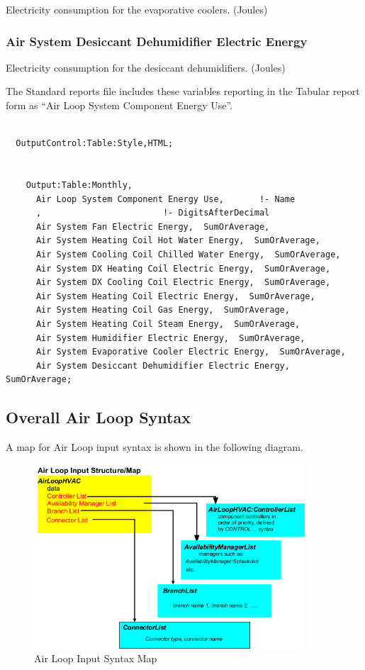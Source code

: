 Electricity consumption for the evaporative coolers. (Joules)

\subsubsection{Air System Desiccant Dehumidifier Electric Energy}\label{air-system-desiccant-dehumidifier-electric-energy}

Electricity consumption for the desiccant dehumidifiers. (Joules)

The Standard reports file includes these variables reporting in the Tabular report form as ``Air Loop System Component Energy Use''.

\begin{lstlisting}

  OutputControl:Table:Style,HTML;


    Output:Table:Monthly,
      Air Loop System Component Energy Use,       !- Name
      ,                        !- DigitsAfterDecimal
      Air System Fan Electric Energy,  SumOrAverage,
      Air System Heating Coil Hot Water Energy,  SumOrAverage,
      Air System Cooling Coil Chilled Water Energy,  SumOrAverage,
      Air System DX Heating Coil Electric Energy,  SumOrAverage,
      Air System DX Cooling Coil Electric Energy,  SumOrAverage,
      Air System Heating Coil Electric Energy,  SumOrAverage,
      Air System Heating Coil Gas Energy,  SumOrAverage,
      Air System Heating Coil Steam Energy,  SumOrAverage,
      Air System Humidifier Electric Energy,  SumOrAverage,
      Air System Evaporative Cooler Electric Energy,  SumOrAverage,
      Air System Desiccant Dehumidifier Electric Energy,  SumOrAverage;
\end{lstlisting}

\subsection{Overall Air Loop Syntax}\label{overall-air-loop-syntax}

A map for Air Loop input syntax is shown in the following diagram.

\begin{figure}[hbtp] %
\centering
\includegraphics[width=0.9\textwidth, height=0.9\textheight, keepaspectratio=true]{media/image214.png}
\caption{Air Loop Input Syntax Map \protect \label{fig:air-loop-input-syntax-map}}
\end{figure}

